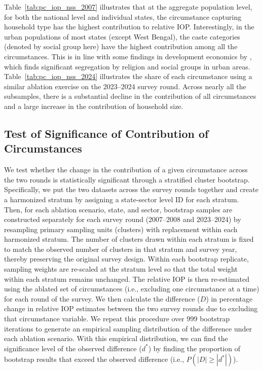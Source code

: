 \documentclass[12pt]{article}
\theoremstyle{plain}
\theoremstyle{definition}
\begin{document}
Table~\ref{tab:pc_iop_nss_2007} illustrates that at the aggregate population level, for both the national level and individual states, the circumstance capturing household type has the highest contribution to relative IOP. Interestingly, in the urban populations of most states (except West Bengal), the caste categories (denoted by social group here) have the highest contribution among all the circumstances. This is in line with some findings in development economics by \cite{Asher2026}, which finds significant segregation by religion and social groups in urban areas. Table~\ref{tab:pc_iop_nss_2024} illustrates the share of each circumstance using a similar ablation exercise on the 2023--2024 survey round. Across nearly all the subsamples, there is a substantial decline in the contribution of all circumstances and a large increase in the contribution of household size.

\subsection{Test of Significance of Contribution of Circumstances}
\label{ssec:sign_contrib_circum}
We test whether the change in the contribution of a given circumstance across the two rounds is statistically significant through a stratified cluster bootstrap. Specifically, we put the two datasets across the survey rounds together and create a harmonized stratum by assigning a state-sector level ID for each stratum. Then, for each ablation scenario, state, and sector, bootstrap samples are constructed separately for each survey round (2007--2008 and 2023--2024) by resampling primary sampling units (clusters) with replacement within each harmonized stratum. The number of clusters drawn within each stratum is fixed to match the observed number of clusters in that stratum and survey year, thereby preserving the original survey design. Within each bootstrap replicate, sampling weights are re-scaled at the stratum level so that the total weight within each stratum remains unchanged. The relative IOP is then re-estimated using the ablated set of circumstances (i.e., excluding one circumstance at a time) for each round of the survey. We then calculate the difference ($D$) in percentage change in relative IOP estimates between the two survey rounds due to excluding that circumstance variable. We repeat this procedure over 999 bootstrap iterations to generate an empirical sampling distribution of the difference under each ablation scenario. With this empirical distribution, we can find the significance level of the observed difference ($d^*$) by finding the proportion of bootstrap results that exceed the observed difference (i.e., $P(|D| \geq |d^*|)$).
\end{document}
